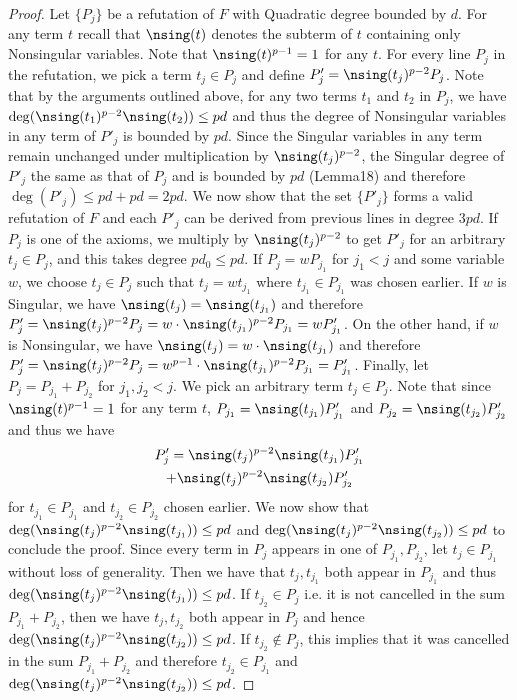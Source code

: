 \begin{proof}
Let $\{P_j\}$ be a refutation of $F$ with Quadratic degree bounded by $d$. For any term $t$ recall that $\nsing(t)$ denotes the subterm of $t$ containing only Nonsingular variables. Note that $\nsing(t)^{p-1}=1$ for any $t$. For every line $P_j$ in the refutation, we pick a term $t_j\in P_j$ and define $P'_j=\nsing(t_j)^{p-2}P_j$. Note that by the arguments outlined above, for any two terms $t_1$ and $t_2$ in $P_j$, we have $\deg(\nsing(t_1)^{p-2}\nsing(t_2))\leq pd$ and thus the degree of Nonsingular variables in any term of $P'_j$ is bounded by $pd$. Since the Singular variables in any term remain unchanged under multiplication by $\nsing(t_j)^{p-2}$, the Singular degree of $P'_j$ the same as that of $P_j$ and is bounded by $pd$ (Lemma18) and therefore $\deg(P'_j)\leq pd+pd=2pd$. We now show that the set $\{P'_j\}$ forms a valid refutation of $F$ and each $P'_j$ can be derived from previous lines in degree $3pd$. If $P_j$ is one of the axioms, we multiply by $\nsing(t_j)^{p-2}$ to get $P'_j$ for an arbitrary $t_j\in P_j$, and this takes degree $pd_0\leq pd$.
If $P_j=wP_{j_1}$ for $j_1<j$ and some variable $w$, we choose $t_j\in P_j$ such that $t_j=wt_{j_1}$ where $t_{j_1}\in P_{j_1}$ was chosen earlier. If $w$ is Singular, we have $\nsing(t_j)=\nsing(t_{j_1})$ and therefore $P'_j=\nsing(t_j)^{p-2}P_j=w\cdot\nsing(t_{j_1})^{p-2}P_{j_1}=wP'_{j_1}$. On the other hand, if $w$ is Nonsingular, we have $\nsing(t_j)=w\cdot\nsing(t_{j_1})$ and therefore $P'_j=\nsing(t_j)^{p-2}P_j=w^{p-1}\cdot\nsing(t_{j_1})^{p-2}P_{j_1}=P'_{j_1}$. Finally, let $P_j=P_{j_1}+P_{j_2}$ for $j_1,j_2<j$. We pick an arbitrary term $t_j\in P_j$. Note that since $\nsing(t)^{p-1}=1$ for any term $t$, $P_{j_1}=\nsing(t_{j_1})P'_{j_1}$ and $P_{j_2}=\nsing(t_{j_2})P'_{j_2}$ and thus we have
\begin{multline*}
P'_j=\nsing(t_j)^{p-2}\nsing(t_{j_1})P'_{j_1}\\
+\nsing(t_j)^{p-2}\nsing(t_{j_2})P'_{j_2}
\end{multline*}
for $t_{j_1}\in P_{j_1}$ and $t_{j_2}\in P_{j_2}$ chosen earlier. We now show that $\deg(\nsing(t_j)^{p-2}\nsing(t_{j_1}))\leq pd$ and $\deg(\nsing(t_j)^{p-2}\nsing(t_{j_2}))\leq pd$ to conclude the proof. Since every term in $P_j$ appears in one of $P_{j_1},P_{j_2}$, let $t_j\in P_{j_1}$ without loss of generality. Then we have that $t_j,t_{j_1}$ both appear in $P_{j_1}$ and thus $\deg(\nsing(t_j)^{p-2}\nsing(t_{j_1}))\leq pd$. If $t_{j_2}\in P_j$ i.e. it is not cancelled in the sum $P_{j_1}+P_{j_2}$, then we have $t_j,t_{j_2}$ both appear in $P_j$ and hence $\deg(\nsing(t_j)^{p-2}\nsing(t_{j_2}))\leq pd$. If $t_{j_2}\notin P_j$, this implies that it was cancelled in the sum $P_{j_1}+P_{j_2}$ and therefore $t_{j_2}\in P_{j_1}$ and $\deg(\nsing(t_j)^{p-2}\nsing(t_{j_2}))\leq pd$.
\end{proof}
